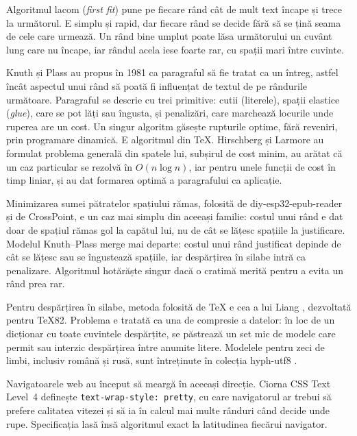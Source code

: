 Algoritmul lacom (\emph{first fit}) pune pe fiecare rând cât de mult text
încape și trece la următorul. E simplu și rapid, dar fiecare rând se decide
fără să se țină seama de cele care urmează. Un rând bine umplut poate lăsa
următorului un cuvânt lung care nu încape, iar rândul acela iese foarte rar,
cu spații mari între cuvinte.

Knuth și Plass \citep{knuth1981} au propus în 1981 ca paragraful să fie
tratat ca un întreg, astfel încât aspectul unui rând să poată fi influențat de
textul de pe rândurile următoare. Paragraful se descrie cu trei primitive:
cutii (literele), spații elastice (\emph{glue}), care se pot lăți sau îngusta,
și penalizări, care marchează locurile unde ruperea are un cost. Un singur
algoritm găsește rupturile optime, fără reveniri, prin programare dinamică.
E algoritmul din TeX. Hirschberg și Larmore \citep{hirschberg1987} au
formulat problema generală din spatele lui, subșirul de cost minim, au arătat
că un caz particular se rezolvă în $O(n \log n)$, iar pentru unele funcții de
cost în timp liniar, și au dat formarea optimă a paragrafului ca aplicație.

Minimizarea sumei pătratelor spațiului rămas, folosită de
diy-esp32-epub-reader și de CrossPoint, e un caz mai simplu din aceeași
familie: costul unui rând e dat doar de spațiul rămas gol la capătul lui, nu
de cât se lățesc spațiile la justificare. Modelul Knuth–Plass merge mai departe: costul unui
rând justificat depinde de cât se lățesc sau se îngustează spațiile, iar
despărțirea în silabe intră ca penalizare. Algoritmul hotărăște singur dacă o
cratimă merită pentru a evita un rând prea rar.

Pentru despărțirea în silabe, metoda folosită de TeX e cea a lui Liang
\citep{liang1983}, dezvoltată pentru TeX82. Problema e tratată ca una de
compresie a datelor: în loc de un dicționar cu toate cuvintele despărțite, se
păstrează un set mic de modele care permit sau interzic despărțirea între
anumite litere. Modelele pentru zeci de limbi, inclusiv română și rusă, sunt
întreținute în colecția hyph-utf8 \citep{texhyphen}.

Navigatoarele web au început să meargă în aceeași direcție. Ciorna CSS Text
Level~4 \citep{csstext4} definește \texttt{text-wrap-style: pretty}, cu care
navigatorul ar trebui să prefere calitatea vitezei și să ia în calcul mai
multe rânduri când decide unde rupe. Specificația lasă însă algoritmul exact
la latitudinea fiecărui navigator.

